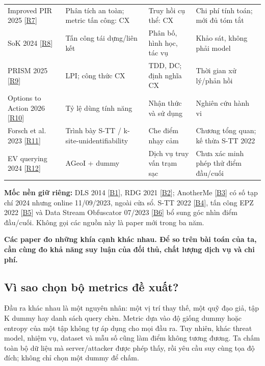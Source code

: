 \documentclass[10pt,a4paper]{article}
\newcommand{\key}[1]{\par\smallskip\noindent\colorbox{pale}{\parbox{\dimexpr\linewidth-2\fboxsep}{\textbf{#1}}}\par\smallskip}
\begin{document}
\begin{longtable}{@{}P{3.871cm}P{4.355cm}P{3.871cm}P{4.258cm}@{}}
\addlinespace[3pt]
Improved PIR 2025 [\hyperlink{ref-R7}{R7}] & Phân tích an toàn; metric tấn công: CX & Truy hồi cụ thể: CX & Chi phí tính toán; mới đủ tóm tắt\\
\addlinespace[3pt]
SoK 2024 [\hyperlink{ref-R8}{R8}] & Tấn công tái dựng/liên kết & Phân bố, hình học, tác vụ & Khảo sát, không phải model\\
\addlinespace[3pt]
PRISM 2025 [\hyperlink{ref-R9}{R9}] & LPI; công thức CX & TDD, DC; định nghĩa CX & Thời gian xử lý/phản hồi\\
\addlinespace[3pt]
Options to Action 2026 [\hyperlink{ref-R10}{R10}] & Tỷ lệ dùng tính năng & Nhận thức và sử dụng & Nghiên cứu hành vi\\
\addlinespace[3pt]
Forsch et al. 2023 [\hyperlink{ref-R11}{R11}] & Trình bày S-TT / k-site-unidentifiability & Che điểm nhạy cảm & Chương tổng quan; kế thừa S-TT 2022\\
\addlinespace[3pt]
EV querying 2024 [\hyperlink{ref-R12}{R12}] & AGeoI + dummy & Dịch vụ truy vấn trạm sạc & Chưa xác minh phép thử điểm đầu/cuối\\
\end{longtable}
\endgroup
\textbf{Mốc nền giữ riêng:} DLS 2014 [\hyperlink{ref-B1}{B1}], RDG 2021 [\hyperlink{ref-B2}{B2}]; AnotherMe [\hyperlink{ref-B3}{B3}] có số tạp chí 2024 nhưng online 11/09/2023, ngoài cửa sổ. S-TT 2022 [\hyperlink{ref-B4}{B4}], tấn công EPZ 2022 [\hyperlink{ref-B5}{B5}] và Data Stream Obfuscator 07/2023 [\hyperlink{ref-B6}{B6}] bổ sung góc nhìn điểm đầu/cuối. Không gọi các nguồn này là paper mới trong ba năm.

\key{Các paper đo những khía cạnh khác nhau. Để so trên bài toán của ta, cần cùng đo khả năng suy luận của đối thủ, chất lượng dịch vụ và chi phí.}


\clearpage
\subsection{Vì sao chọn bộ metrics đề xuất?}\label{sub:1.2}
Đầu ra khác nhau là một nguyên nhân: một vị trí thay thế, một quỹ đạo giả, tập K dummy hay danh sách query chèn. Metric dựa vào độ giống dummy hoặc entropy của một tập không tự áp dụng cho mọi đầu ra. Tuy nhiên, khác threat model, nhiệm vụ, dataset và mẫu số cũng làm điểm không tương đương. Ta chấm toàn bộ dữ liệu mà server/attacker được phép thấy, rồi yêu cầu suy cùng tọa độ đích; không chỉ chọn một dummy để chấm.
\end{document}
